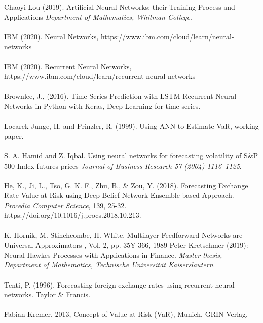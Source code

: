 \documentclass[a4paper,11pt,oneside]{book}
\begin{document}
Chaoyi Lou (2019). Artificial Neural Networks:
their Training Process and Applications \textit{Department of Mathematics, Whitman College}.\\\\
IBM (2020). Neural Networks, https://www.ibm.com/cloud/learn/neural-networks\\\\
IBM (2020). Recurrent Neural Networks, https://www.ibm.com/cloud/learn/recurrent-neural-networks\\\\
Brownlee, J., (2016). Time Series Prediction with LSTM Recurrent Neural Networks
in Python with Keras, Deep Learning for time series.\\\\
Locarek-Junge, H. and Prinzler, R. (1999). Using ANN to Estimate VaR, working
paper.\\\\
S. A. Hamid and Z. Iqbal. Using neural networks for forecasting volatility of S\&P 500 Index futures prices \textit{Journal of Business Research 57 (2004) 1116–1125}.\\\\
He, K., Ji, L., Tso, G. K. F., Zhu, B., \& Zou, Y. (2018). Forecasting Exchange Rate Value at Risk using Deep Belief Network Ensemble based Approach. \textit{Procedia Computer Science}, 139, 25-32.
https://doi.org/10.1016/j.procs.2018.10.213.\\\\
K. Hornik, M. Stinchcombe, H. White. Multilayer Feedforward Networks are Universal Approximators , Vol. 2, pp. 35Y-366, 1989
Peter Kretschmer (2019): Neural Hawkes Processes with Applications
in Finance. \textit{Master thesis, Department of Mathematics, Technische Universität Kaiserslautern}.\\\\
Tenti, P. (1996). Forecasting foreign exchange rates using recurrent neural networks. Taylor \& Francis.\\\\
Fabian Kremer, 2013, Concept of Value at Risk (VaR), Munich, GRIN Verlag.



\listoffigures
\listoftables


\end{document}

